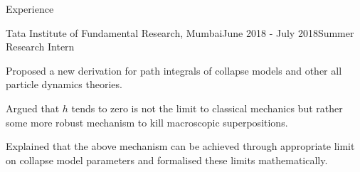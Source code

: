 \documentclass{resume} %
\begin{document}
\begin{rSection}{Experience}
\begin{rSubsection}{Tata Institute of Fundamental Research, Mumbai}{June 2018 - July 2018}{Summer Research Intern}{}
\item Proposed a new derivation for path integrals of collapse models and other all particle dynamics theories.
\item Argued that $h$ tends to zero is not the limit to classical mechanics but rather some more robust mechanism to kill macroscopic superpositions.
\item Explained that the above mechanism can be achieved through appropriate limit on collapse model parameters and formalised these limits mathematically.
\end{rSubsection}

\end{rSection}
\end{document}
